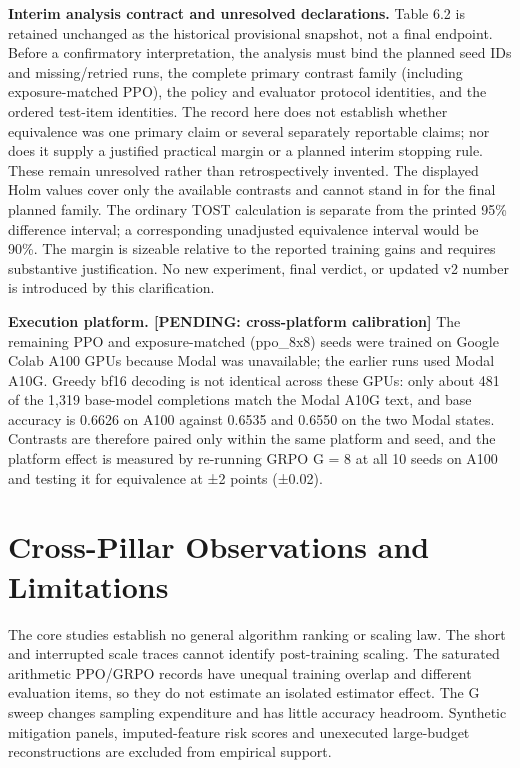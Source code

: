 \documentclass[12pt,a4paper]{report}
\begin{document}
\textbf{Interim analysis contract and unresolved declarations.} Table
6.2 is retained unchanged as the historical provisional snapshot, not a
final endpoint. Before a confirmatory interpretation, the analysis must
bind the planned seed IDs and missing/retried runs, the complete primary
contrast family (including exposure-matched PPO), the policy and
evaluator protocol identities, and the ordered test-item identities. The
record here does not establish whether equivalence was one primary claim
or several separately reportable claims; nor does it supply a justified
practical margin or a planned interim stopping rule. These remain
unresolved rather than retrospectively invented. The displayed Holm
values cover only the available contrasts and cannot stand in for the
final planned family. The ordinary TOST calculation is separate from the
printed 95\% difference interval; a corresponding unadjusted equivalence
interval would be 90\%. The margin is sizeable relative to the reported
training gains and requires substantive justification. No new
experiment, final verdict, or updated v2 number is introduced by this
clarification.

\textbf{Execution platform. {[}PENDING: cross-platform calibration{]}}
The remaining PPO and exposure-matched (ppo\_8x8) seeds were trained on
Google Colab A100 GPUs because Modal was unavailable; the earlier runs
used Modal A10G. Greedy bf16 decoding is not identical across these
GPUs: only about 481 of the 1,319 base-model completions match the Modal
A10G text, and base accuracy is 0.6626 on A100 against 0.6535 and 0.6550
on the two Modal states. Contrasts are therefore paired only within the
same platform and seed, and the platform effect is measured by
re-running GRPO G = 8 at all 10 seeds on A100 and testing it for
equivalence at ±2 points (±0.02).

\section{Cross-Pillar Observations and
Limitations}\label{cross-pillar-observations-and-limitations}

The core studies establish no general algorithm ranking or scaling law.
The short and interrupted scale traces cannot identify post-training
scaling. The saturated arithmetic PPO/GRPO records have unequal training
overlap and different evaluation items, so they do not estimate an
isolated estimator effect. The G sweep changes sampling expenditure and
has little accuracy headroom. Synthetic mitigation panels,
imputed-feature risk scores and unexecuted large-budget reconstructions
are excluded from empirical support.
\end{document}
